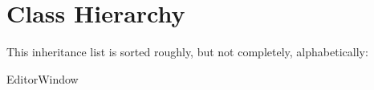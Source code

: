 \section{Class Hierarchy}
This inheritance list is sorted roughly, but not completely, alphabetically\+:\begin{DoxyCompactList}
\item {}
\item {}
\item Editor\+Window\begin{DoxyCompactList}
\item {}
\end{DoxyCompactList}
\end{DoxyCompactList}
